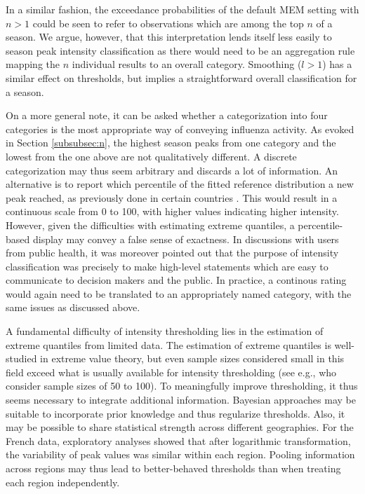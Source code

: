 \documentclass[12pt]{article}
\begin{document}
In a similar fashion, the exceedance probabilities of the default MEM setting with $n > 1$ could be seen to refer to observations which are among the top $n$ of a season. We argue, however, that this interpretation lends itself less easily to season peak intensity classification as there would need to be an aggregation rule mapping the $n$ individual results to an overall category. Smoothing ($l > 1$) has a similar effect on thresholds, but implies a straightforward overall classification for a season.


On a more general note, it can be asked whether a categorization into four categories is the most appropriate way of conveying influenza activity. As evoked in Section \ref{subsubsec:n}, the highest season peaks from one category and the lowest from the one above are not qualitatively different. A discrete categorization may thus seem arbitrary and discards a lot of information. An alternative is to report which percentile of the fitted reference distribution a new peak reached, as previously done in certain countries \citep{Green2015}. This would result in a continuous scale from 0 to 100, with higher values indicating higher intensity. However, given the difficulties with estimating extreme quantiles, a percentile-based display may convey a false sense of exactness. In discussions with users from public health, it was moreover pointed out that the purpose of intensity classification was precisely to make high-level statements which are easy to communicate to decision makers and the public. In practice, a continous rating would again need to be translated to an appropriately named category, with the same issues as discussed above.

A fundamental difficulty of intensity thresholding lies in the estimation of extreme quantiles from limited data. The estimation of extreme quantiles is well-studied in extreme value theory, but even sample sizes considered small in this field exceed what is usually available for intensity thresholding (see e.g., \citealt{Pisarenko2017} who consider sample sizes of 50 to 100). To meaningfully improve thresholding, it thus seems necessary to integrate additional information. Bayesian approaches may be suitable to incorporate prior knowledge and thus regularize thresholds. Also, it may be possible to share statistical strength across different geographies. For the French data, exploratory analyses showed that after logarithmic transformation, the variability of peak values was similar within each region. Pooling information across regions may thus lead to better-behaved thresholds than when treating each region independently.
\end{document}
